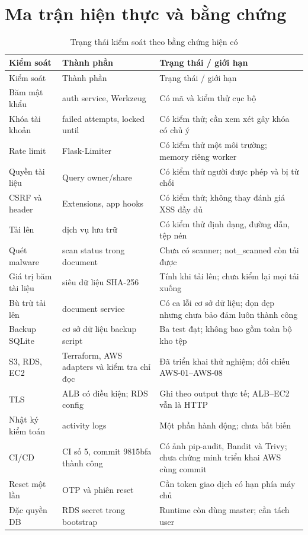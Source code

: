 \chapter{Ma trận hiện thực và bằng chứng}
{\small\begin{longtable}{P{3.2cm}P{4.8cm}P{4.7cm}}
\caption{Trạng thái kiểm soát theo bằng chứng hiện có}\\\toprule
\textbf{Kiểm soát}&\textbf{Thành phần}&\textbf{Trạng thái / giới hạn}\\\midrule\endfirsthead
\toprule Kiểm soát&Thành phần&Trạng thái / giới hạn\\\midrule\endhead
Băm mật khẩu & auth service, Werkzeug & Có mã và kiểm thử cục bộ\\
Khóa tài khoản & failed attempts, locked until & Có kiểm thử; cần xem xét gây khóa có chủ ý\\
Rate limit & Flask-Limiter & Có kiểm thử một môi trường; memory riêng worker\\
Quyền tài liệu & Query owner/share & Có kiểm thử người được phép và bị từ chối\\
CSRF và header & Extensions, app hooks & Có kiểm thử; không thay đánh giá XSS đầy đủ\\
Tải lên & dịch vụ lưu trữ & Có kiểm thử định dạng, đường dẫn, tệp nén\\
Quét malware & scan status trong document & Chưa có scanner; not\_scanned còn tải được\\
Giá trị băm tài liệu & siêu dữ liệu SHA-256 & Tính khi tải lên; chưa kiểm lại mọi tải xuống\\
Bù trừ tải lên & document service & Có ca lỗi cơ sở dữ liệu; dọn dẹp nhưng chưa bảo đảm luôn thành công\\
Backup SQLite & cơ sở dữ liệu backup script & Ba test đạt; không bao gồm toàn bộ kho tệp\\
S3, RDS, EC2 & Terraform, AWS adapters và kiểm tra chỉ đọc & Đã triển khai thử nghiệm; đối chiếu AWS-01--AWS-08\\
TLS & ALB có điều kiện; RDS config & Ghi theo output thực tế; ALB--EC2 vẫn là HTTP\\
Nhật ký kiểm toán & activity logs & Một phần hành động; chưa bất biến\\
CI/CD & CI số 5, commit 9815bfa thành công & Có ảnh pip-audit, Bandit và Trivy; chưa chứng minh triển khai AWS cùng commit\\
Reset một lần & OTP và phiên reset & Cần token giao dịch có hạn phía máy chủ\\
Đặc quyền DB & RDS secret trong bootstrap & Runtime còn dùng master; cần tách user\\\bottomrule
\end{longtable}}

